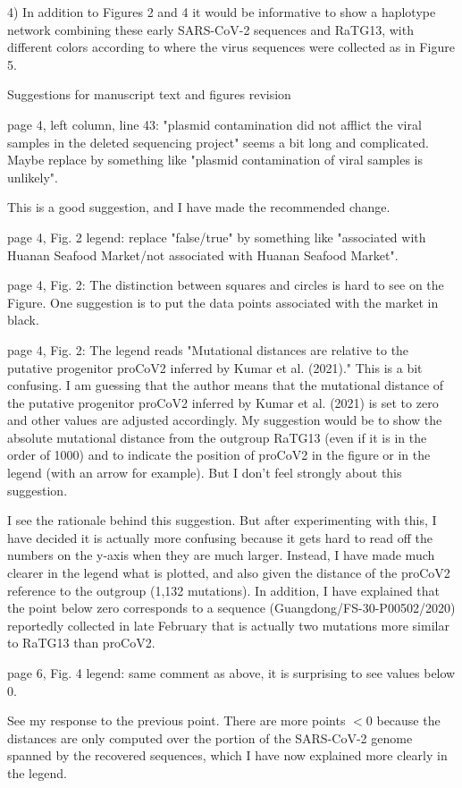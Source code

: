 \documentclass[11pt, oneside]{article}   	%
\newcommand{\response}[1]{{\color{black}#1}}
\begin{document}
4) In addition to Figures 2 and 4 it would be informative to show a haplotype network combining these early SARS-CoV-2 sequences and RaTG13, with different colors according to where the virus sequences were collected as in Figure 5.


Suggestions for manuscript text and figures revision

page 4, left column, line 43: "plasmid contamination did not afflict the viral samples in the deleted sequencing project" seems a bit long and complicated. Maybe replace by something like "plasmid contamination of viral samples is unlikely".

\response{This is a good suggestion, and I have made the recommended change.}

page 4, Fig. 2 legend: replace "false/true" by something like "associated with Huanan Seafood Market/not associated with Huanan Seafood Market".

page 4, Fig. 2: The distinction between squares and circles is hard to see on the Figure. One suggestion is to put the data points associated with the market in black.

page 4, Fig. 2: The legend reads "Mutational distances are relative to the putative progenitor proCoV2 inferred by Kumar et al. (2021)." This is a bit confusing. I am guessing that the author means that the mutational distance of the putative progenitor proCoV2 inferred by Kumar et al. (2021) is set to zero and other values are adjusted accordingly. My suggestion would be to show the absolute mutational distance from the outgroup RaTG13 (even if it is in the order of 1000) and to indicate the position of proCoV2 in the figure or in the legend (with an arrow for example). But I don't feel strongly about this suggestion.

\response{I see the rationale behind this suggestion. But after experimenting with this, I have decided it is actually more confusing because it gets hard to read off the numbers on the y-axis when they are much larger. Instead, I have made much clearer in the legend what is plotted, and also given the distance of the proCoV2 reference to the outgroup (1,132 mutations). In addition, I have explained that the point below zero corresponds to a sequence (Guangdong/FS-30-P00502/2020) reportedly collected in late February that is actually two mutations more similar to RaTG13 than proCoV2.}

page 6, Fig. 4 legend: same comment as above, it is surprising to see values below 0. 

\response{See my response to the previous point. There are more points $< 0$ because the distances are only computed over the portion of the SARS-CoV-2 genome spanned by the recovered sequences, which I have now explained more clearly in the legend.}
\end{document}
